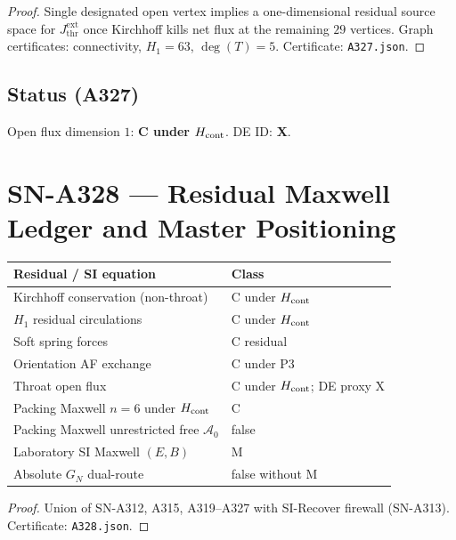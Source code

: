 \begin{proof}
Single designated open vertex implies a one-dimensional residual source space for $J_{\mathrm{thr}}^{\mathrm{ext}}$ once Kirchhoff kills net flux at the remaining $29$ vertices. Graph certificates: connectivity, $H_1=63$, $\deg(T)=5$. Certificate: \texttt{A327.json}.
\end{proof}

\subsection*{Status (A327)}
Open flux dimension $1$: \textbf{C under $H_{\rm cont}$}. DE ID: \textbf{X}.

\section{SN-A328 --- Residual Maxwell Ledger and Master Positioning}
\label{sec:SN-A328}

\begin{theorem}
\label{thm:A328-ledger}
\begin{center}
\begin{tabular}{@{}p{7.2cm}p{5.0cm}@{}}
\toprule
Residual / SI equation & Class \\
\midrule
Kirchhoff conservation (non-throat) & C under $H_{\rm cont}$ \\
$H_1$ residual circulations & C under $H_{\rm cont}$ \\
Soft spring forces & C residual \\
Orientation AF exchange & C under P3 \\
Throat open flux & C under $H_{\rm cont}$; DE proxy X \\
Packing Maxwell $n=6$ under $H_{\rm cont}$ & C \\
Packing Maxwell unrestricted free $\mathcal{A}_0$ & false \\
Laboratory SI Maxwell $(E,B)$ & M \\
Absolute $G_N$ dual-route & false without M \\
\bottomrule
\end{tabular}
\end{center}
\end{theorem}

\begin{proof}
Union of SN-A312, A315, A319--A327 with SI-Recover firewall (SN-A313). Certificate: \texttt{A328.json}.
\end{proof}

